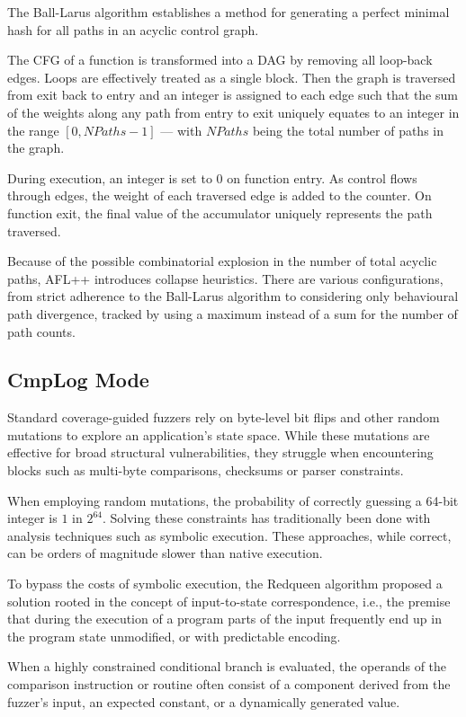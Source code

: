 The Ball-Larus algorithm \cite{ball1996efficient} establishes a method for generating a perfect minimal hash for all paths in an acyclic control graph.

The CFG of a function is transformed into a DAG by removing all loop-back edges. Loops are effectively treated as a single block. Then the graph is traversed from exit back to entry and an integer is assigned to each edge such that the sum of the weights along any path from entry to exit uniquely equates to an integer in the range $[0, NPaths - 1]$ --- with $NPaths$ being the total number of paths in the graph.

During execution, an integer is set to 0 on function entry. As control flows through edges, the weight of each traversed edge is added to the counter. On function exit, the final value of the accumulator uniquely represents the path traversed.

Because of the possible combinatorial explosion in the number of total acyclic paths, AFL++ introduces collapse heuristics. There are various configurations, from strict adherence to the Ball-Larus algorithm to considering only behavioural path divergence, tracked by using a maximum instead of a sum for the number of path counts. 

\subsection{CmpLog Mode}

Standard coverage-guided fuzzers rely on byte-level bit flips and other random mutations to explore an application's state space. While these mutations are effective for broad structural vulnerabilities, they struggle when encountering blocks such as multi-byte comparisons, checksums or parser constraints.

When employing random mutations, the probability of correctly guessing a 64-bit integer is $1$ in $2^{64}$. Solving these constraints has traditionally been done with analysis techniques such as symbolic execution. These approaches, while correct, can be orders of magnitude slower than native execution.

To bypass the costs of symbolic execution, the Redqueen algorithm \cite{aschermann2019redqueen} proposed a solution rooted in the concept of input-to-state correspondence, i.e., the premise that during the execution of a program parts of the input frequently end up in the program state unmodified, or with predictable encoding.

When a highly constrained conditional branch is evaluated, the operands of the comparison instruction or routine often consist of a component derived from the fuzzer's input, an expected constant, or a dynamically generated value.

